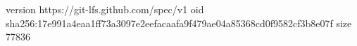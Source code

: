 version https://git-lfs.github.com/spec/v1
oid sha256:17e991a4eaa1ff73a3097e2eefacaafa9f479ae04a85368cd0f9582cf3b8e07f
size 77836
